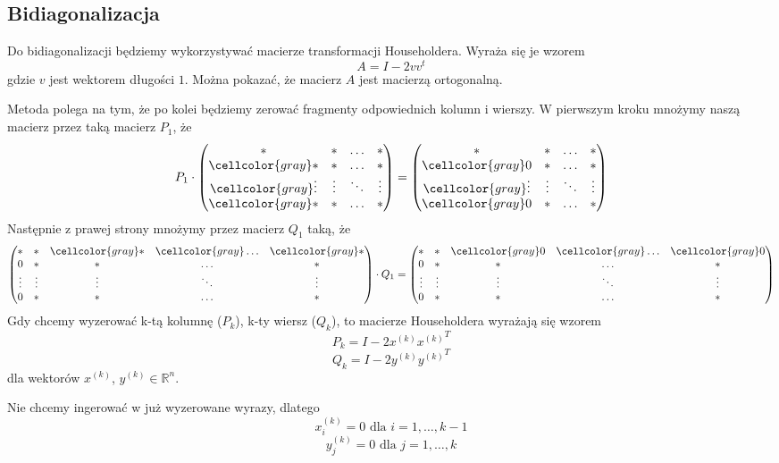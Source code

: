 \documentclass{article}
\theoremstyle{definition}
\newcommand{\szary}{\cellcolor{gray}}
\begin{document}
\subsection{Bidiagonalizacja}
Do bidiagonalizacji będziemy wykorzystywać macierze transformacji Householdera. Wyraża się je wzorem
$$A = I - 2vv^t $$
gdzie $v$ jest wektorem długości $1$. Można pokazać, że macierz $A$ jest macierzą ortogonalną.

Metoda polega na tym, że po kolei będziemy zerować fragmenty odpowiednich kolumn i wierszy. W pierwszym kroku mnożymy naszą macierz przez taką macierz $P_1$, że 
$$ P_1 \cdot \begin{pmatrix} \ast & \ast & \ldots & \ast \\
\szary \ast & \ast & \ldots & \ast \\
\szary \vdots & \vdots & \ddots & \vdots \\
\szary \ast & \ast & \ldots & \ast
\end{pmatrix}
=
\begin{pmatrix} \ast & \ast & \ldots & \ast \\
\szary 0 & \ast & \ldots & \ast \\
 \szary \vdots & \vdots & \ddots & \vdots \\
\szary 0 & \ast & \ldots & \ast
\end{pmatrix}$$
Następnie z prawej strony mnożymy przez macierz $Q_1$ taką, że 
$$ \begin{pmatrix} \ast & \ast & \szary \ast & \szary \ldots & \szary \ast \\
0 & \ast & \ast & \ldots & \ast \\
\vdots & \vdots & \vdots & \ddots & \vdots \\
0 & \ast & \ast & \ldots & \ast
\end{pmatrix}
\cdot Q_1 = 
\begin{pmatrix} \ast & \ast & \szary 0 & \szary \ldots & \szary 0 \\
0 & \ast & \ast & \ldots & \ast \\
\vdots & \vdots & \vdots & \ddots & \vdots \\
0 & \ast & \ast & \ldots & \ast
\end{pmatrix}$$
Gdy chcemy wyzerować k-tą kolumnę ($P_k$), k-ty wiersz ($Q_k$), to macierze Householdera wyrażają się wzorem
$$ P_k = I - 2x^{(k)}{x^{(k)}}^T $$
$$ Q_k = I - 2{y^{(k)}y^{(k)}}^T $$
dla wektorów $x^{(k)}$, $y^{(k)} \in \mathbb{R}^n$.

Nie chcemy ingerować w już wyzerowane wyrazy, dlatego 
$$ x^{(k)}_i = 0 \text{ dla } i=1,\ldots,k-1$$
$$ y^{(k)}_j = 0 \text{ dla } j=1,\ldots,k$$
\end{document}

